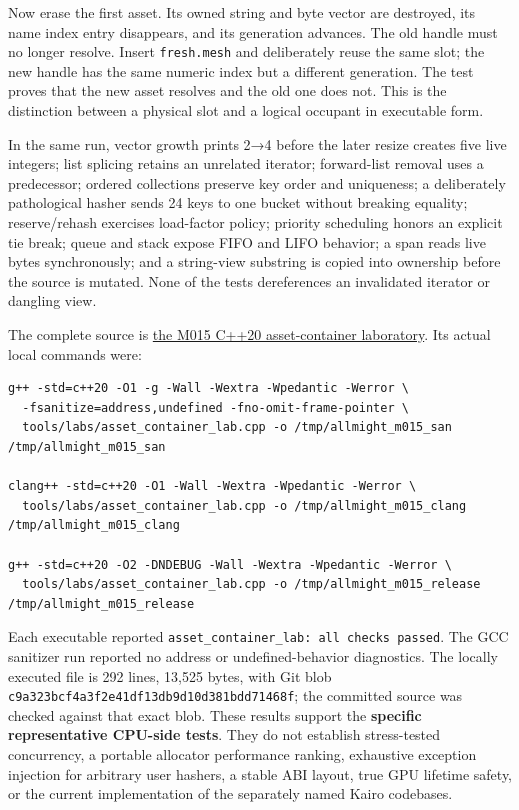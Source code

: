 Now erase the first asset. Its owned string and byte vector are destroyed, its name index entry disappears, and its generation advances. The old handle must no longer resolve. Insert \texttt{fresh.mesh} and deliberately reuse the same slot; the new handle has the same numeric index but a different generation. The test proves that the new asset resolves and the old one does not. This is the distinction between a physical slot and a logical occupant in executable form.

In the same run, vector growth prints 2→4 before the later resize creates five live integers; list splicing retains an unrelated iterator; forward-list removal uses a predecessor; ordered collections preserve key order and uniqueness; a deliberately pathological hasher sends 24 keys to one bucket without breaking equality; reserve/rehash exercises load-factor policy; priority scheduling honors an explicit tie break; queue and stack expose FIFO and LIFO behavior; a span reads live bytes synchronously; and a string-view substring is copied into ownership before the source is mutated. None of the tests dereferences an invalidated iterator or dangling view.

The complete source is \href{tools/labs/asset_container_lab.cpp}{the M015 C++20 asset-container laboratory}. Its actual local commands were:

\begin{verbatim}
g++ -std=c++20 -O1 -g -Wall -Wextra -Wpedantic -Werror \
  -fsanitize=address,undefined -fno-omit-frame-pointer \
  tools/labs/asset_container_lab.cpp -o /tmp/allmight_m015_san
/tmp/allmight_m015_san

clang++ -std=c++20 -O1 -Wall -Wextra -Wpedantic -Werror \
  tools/labs/asset_container_lab.cpp -o /tmp/allmight_m015_clang
/tmp/allmight_m015_clang

g++ -std=c++20 -O2 -DNDEBUG -Wall -Wextra -Wpedantic -Werror \
  tools/labs/asset_container_lab.cpp -o /tmp/allmight_m015_release
/tmp/allmight_m015_release
\end{verbatim}

Each executable reported \texttt{asset\_container\_lab:\ all\ checks\ passed}. The GCC sanitizer run reported no address or undefined-behavior diagnostics. The locally executed file is 292 lines, 13,525 bytes, with Git blob \texttt{c9a323bcf4a3f2e41df13db9d10d381bdd71468f}; the committed source was checked against that exact blob. These results support the \textbf{specific representative CPU-side tests}. They do not establish stress-tested concurrency, a portable allocator performance ranking, exhaustive exception injection for arbitrary user hashers, a stable ABI layout, true GPU lifetime safety, or the current implementation of the separately named Kairo codebases.

